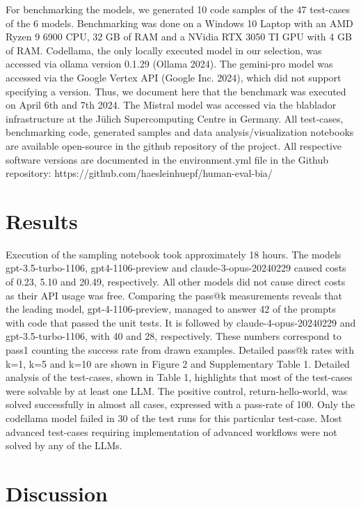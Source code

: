 \documentclass{ecai}
\begin{document}
For benchmarking the models, we generated 10 code samples of the 47 test-cases of the 6 models. Benchmarking was done on a Windows 10 Laptop with an AMD Ryzen 9 6900 CPU, 32 GB of RAM and a NVidia RTX 3050 TI GPU with 4 GB of RAM. Codellama, the only locally executed model in our selection, was accessed via ollama version 0.1.29 (Ollama 2024). The gemini-pro model was accessed via the Google Vertex API (Google Inc. 2024), which did not support specifying a version. Thus, we document here that the benchmark was executed on April 6th and 7th 2024. The Mistral model was accessed via the blablador infrastructure at the Jülich Supercomputing Centre in Germany.
All test-cases, benchmarking code, generated samples and data analysis/visualization notebooks are available open-source in the github repository of the project. All respective software versions are documented  in the environment.yml file in the Github repository:
https://github.com/haesleinhuepf/human-eval-bia/ 

\section{Results}

Execution of the sampling notebook took approximately 18 hours. The models gpt-3.5-turbo-1106, gpt4-1106-preview and claude-3-opus-20240229 caused costs of 0.23, 5.10 and 20.49, respectively. All other models did not cause direct costs as their API usage was free. Comparing the pass@k measurements reveals that the leading model, gpt-4-1106-preview, managed to answer 42 of the prompts with code that passed the unit tests. It is followed by claude-4-opus-20240229 and gpt-3.5-turbo-1106, with 40 and 28, respectively. These numbers correspond to pass1 counting the success rate from drawn examples. Detailed pass@k rates with k=1, k=5 and k=10 are shown in Figure 2 and Supplementary Table 1. 
Detailed analysis of the test-cases, shown in Table 1, highlights that most of the test-cases were solvable by at least one LLM. The positive control, return-hello-world, was solved successfully in almost all cases, expressed with a pass-rate of 100. Only the codellama model failed in 30 of the test runs for this particular test-case. Most advanced test-cases requiring implementation of advanced workflows were not solved by any of the LLMs.  



\section{Discussion}
\end{document}
